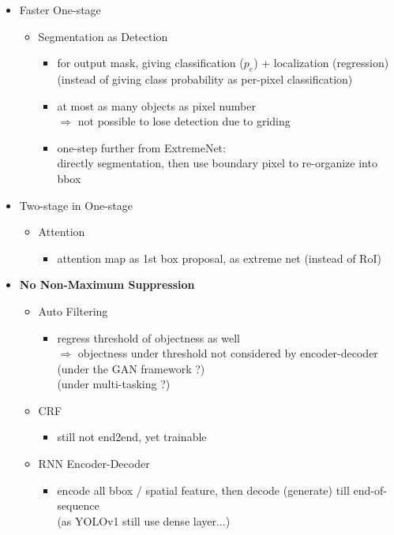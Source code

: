 \begin{itemize}
\item Faster One-stage
	\begin{itemize}
	\item Segmentation as Detection
		\begin{itemize}
		\item for output mask, giving classification ($p_e$) + localization (regression) \\
		(instead of giving class probability as per-pixel classification)
		\item at most as many objects as pixel number \\ 
		$\Rightarrow$ not possible to lose detection due to griding
		\item one-step further from ExtremeNet: \\
		directly segmentation, then use boundary pixel to re-organize into bbox
		\end{itemize}
	\end{itemize}
\item Two-stage in One-stage
	\begin{itemize}
	\item Attention
		\begin{itemize}
		\item attention map as 1st box proposal, as extreme net (instead of RoI)
		\end{itemize}
	\end{itemize}
\item \textbf{No Non-Maximum Suppression}
	\begin{itemize}
	\item Auto Filtering
		\begin{itemize}
		\item regress threshold of objectness as well \\
		$\Rightarrow$ objectness under threshold not considered by encoder-decoder \\
		(under the GAN framework ?) \\
		(under multi-tasking ?)
		\end{itemize}
	\item CRF
		\begin{itemize}
		\item still not end2end, yet trainable
		\end{itemize}
	\item RNN Encoder-Decoder
		\begin{itemize}
		\item encode all bbox / spatial feature, then decode (generate) till end-of-sequence \\
		(as YOLOv1 still use dense layer...)
		\end{itemize}
	\end{itemize}
\end{itemize}

